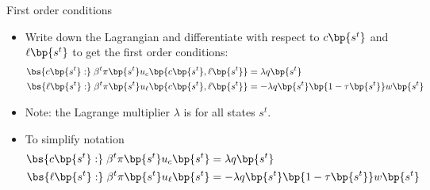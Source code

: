 \documentclass[11pt,xcolor={dvipsnames},hyperref={pdftex,pdfpagemode=UseNone,hidelinks,pdfdisplaydoctitle=true},usepdftitle=false]{beamer}
\begin{document}
    \begin{frame}{First order conditions}
    \begin{itemize}
    \item Write down the Lagrangian and differentiate with respect to $c\bp{s^t}$ and $\ell\bp{s^t}$ to get the first order conditions:
    \begin{align*}
    \bs{c\bp{s^t}:} \;\beta^t \pi\bp{s^t} u_c \bp{c \bp{s^t},\ell\bp{s^t}} & =\lambda q\bp{s^t}\\
    \bs{\ell\bp{s^t}:} \;\beta^t \pi\bp{s^t} u_{\ell} \bp{c \bp{s^t},\ell\bp{s^t}} & =-\lambda q\bp{s^t}\bp{1 - \tau\bp{s^t} }w \bp{s^t}
    \end{align*}
    \item Note: the Lagrange multiplier $\lambda$ is  for all states $s^t$.
    \item To simplify notation 
    \begin{align*}
        \bs{c\bp{s^t}:} \;\beta^t \pi\bp{s^t} u_c \bp{s^t} & =\lambda q\bp{s^t}\\
        \bs{\ell\bp{s^t}:} \;\beta^t \pi\bp{s^t} u_{\ell} \bp{s^t} & =-\lambda q\bp{s^t}\bp{1 - \tau\bp{s^t} }w \bp{s^t}
        \end{align*}
    \end{itemize}
    \end{frame}
\end{document}
